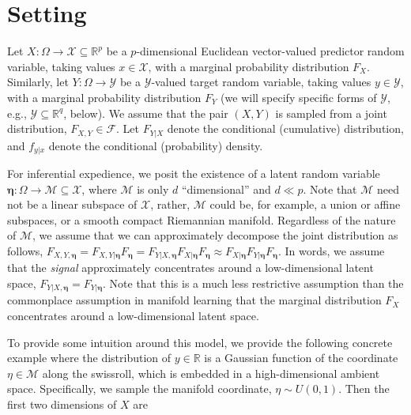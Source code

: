 \documentclass{article} %
\newcommand{\Real}{\mathbb{R}}
\providecommand{\mb}[1]{\boldsymbol{#1}}
\providecommand{\mc}[1]{\mathcal{#1}}
\newcommand{\from}{{\ensuremath{\colon}}}  %
\begin{document}
\section{Setting} \label{sec:setting}
Let $X \from \Omega \to \mc{X} \subseteq \Real^p$ be a 
$p$-dimensional Euclidean vector-valued predictor random variable, taking values $x \in \mc{X}$, with a marginal probability distribution $F_X$.  
Similarly, let $Y \from \Omega \to \mc{Y}$ 
be a $\mc{Y}$-valued target random variable, taking values $y \in \mc{Y}$, with a marginal probability distribution $F_Y$ (we will specify specific forms of $\mc{Y}$, e.g., $\mc{Y} \subseteq \Real^q$, below).  We assume that the pair $(X,Y)$ is sampled from a joint distribution, $F_{X,Y} \in \mc{F}$. Let $F_{Y|X}$ denote the conditional (cumulative) distribution, and $f_{y|x}$ denote the conditional (probability) density.

For inferential expedience, we  posit the existence of  a latent random variable $\mb{\eta} \from \Omega \to \mc{M} \subseteq \mc{X}$, where $\mc{M}$ is only $d$ ``dimensional'' and $d \ll p$.   
Note that $\mc{M}$ need not be a linear subspace of $\mc{X}$, rather, $\mc{M}$ could be, for example,  a union or affine subspaces, or a smooth compact Riemannian manifold.  Regardless of the nature of $\mc{M}$, we assume that we can approximately decompose the joint distribution as follows,  $F_{X,Y,\mb{\eta}}=F_{X,Y|\mb{\eta}}F_{\mb{\eta}} = F_{Y|X, \mb{\eta}} F_{X | \mb{\eta}} F_{\mb{\eta}} \approx F_{X|\mb{\eta}} F_{Y|\mb{\eta}} F_{\mb{\eta}}$.  In  words, we assume that the \emph{signal} approximately concentrates around a low-dimensional latent space, $F_{Y|X,\mb{\eta}}=F_{Y|\mb{\eta}}$.  Note that this is a much less restrictive assumption than the commonplace assumption in manifold learning that the marginal distribution $F_X$ concentrates around a low-dimensional latent space. 

To provide some intuition around this model, we provide the following concrete example where the distribution of $y \in \Real$ is a Gaussian function of the coordinate $\eta \in \mc{M}$ along the swissroll, which is embedded in a high-dimensional ambient space.  Specifically, we sample the manifold coordinate, $\eta  \sim U(0,1)$.  Then the first two dimensions of $X$ are
\end{document}
